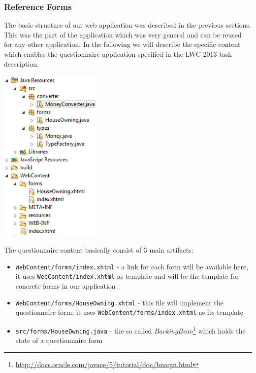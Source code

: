 \subsubsection{Reference Forms}
\label{subsec:referenceForms}
The basic structure of our web application was described in the previous
sections. This was the part of the application which was very general and can be
reused for any other application. In the following we will describe the specific
content which enables the questionnaire application specified in the LWC 2013
task description. 

\begin{center}
 \includegraphics[width=5cm]{./images/chapter02/referenceimpl_forms.png}
\end{center}

The questionnaire content basically consist of 3 main artifacts:

\begin{itemize}
\item \texttt{WebContent/forms/index.xhtml} - a link for each form will be
available here, it uses \texttt{WebContent/index.xhtml} as template and will be
the template for concrete forms in our application
\item \texttt{WebContent/forms/HouseOwning.xhtml} - this file will implement the
questionnaire form, it uses \newline\texttt{WebContent/forms/index.xhtml} as its
template
\item \texttt{src/forms/HouseOwning.java} - the so called
\emph{BackingBean}\footnote{\url{http://docs.oracle.com/javaee/5/tutorial/doc/bnaqm.html}}
which holds the state of a questionnaire form
\end{itemize}

